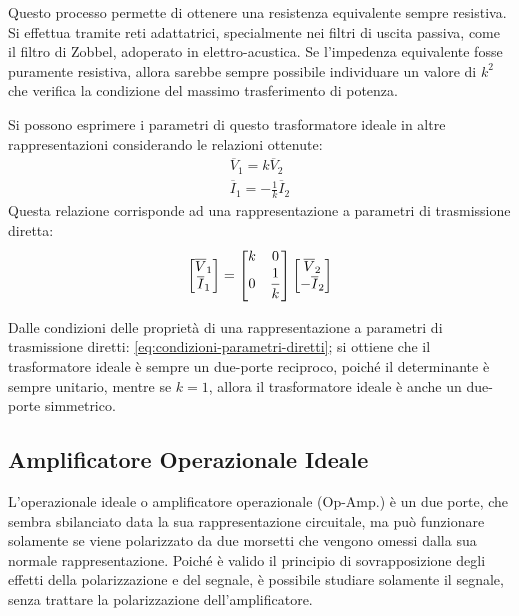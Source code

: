 \documentclass{article}
\numberwithin{equation}{subsection}
\begin{document}
Questo processo permette di ottenere una resistenza equivalente sempre resistiva. Si effettua tramite reti adattatrici, specialmente nei filtri di uscita passiva, come 
il filtro di Zobbel, adoperato in elettro-acustica. Se l'impedenza equivalente fosse puramente resistiva, allora sarebbe sempre possibile individuare un valore di $k^2$ che 
verifica la condizione del massimo trasferimento di potenza. 

Si possono esprimere i parametri di questo trasformatore ideale in altre rappresentazioni considerando le relazioni ottenute:
\begin{gather*}
    \overline{V}_1=k\overline{V}_2\\
    \overline{I}_1=-\displaystyle\frac{1}{k}\overline{I}_2
\end{gather*}
Questa relazione corrisponde ad una rappresentazione a parametri di trasmissione diretta:
\begin{gather*}
    \begin{bmatrix}
        \overline V_1\\ \overline I_1
    \end{bmatrix}=\begin{bmatrix}
        k&0\\0& \displaystyle\frac{\strut 1}{\strut k}
    \end{bmatrix}\begin{bmatrix}
        \overline{V}_2\\ -\overline{I}_2
    \end{bmatrix}
\end{gather*}

Dalle condizioni delle proprietà di una rappresentazione a parametri di trasmissione diretti: \ref{eq:condizioni-parametri-diretti}; si ottiene che il trasformatore ideale è 
sempre un due-porte reciproco, poiché il determinante è sempre unitario, mentre se $k=1$, allora il trasformatore ideale è anche un due-porte simmetrico. 

\subsection{Amplificatore Operazionale Ideale}

L'operazionale ideale o amplificatore operazionale (Op-Amp.) è un due porte, che sembra sbilanciato data la sua rappresentazione circuitale, ma può funzionare solamente se 
viene polarizzato da due morsetti che vengono omessi dalla sua normale rappresentazione. Poiché è valido il principio di sovrapposizione degli effetti della polarizzazione 
e del segnale, è possibile studiare solamente il segnale, senza trattare la polarizzazione dell'amplificatore. 
\end{document}
